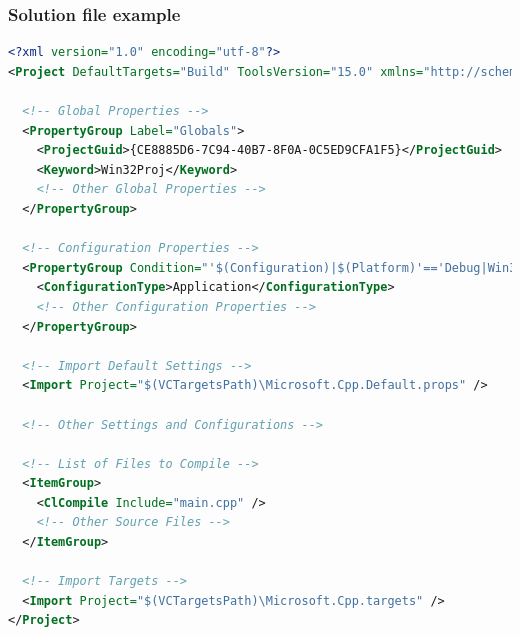 \documentclass{beamer}
\begin{document}
\begin{frame}[fragile]
\tiny
\frametitle{Solution file example}
\begin{lstlisting}[language=xml]
    <?xml version="1.0" encoding="utf-8"?>
<Project DefaultTargets="Build" ToolsVersion="15.0" xmlns="http://schemas.microsoft.com/developer/msbuild/2003">

  <!-- Global Properties -->
  <PropertyGroup Label="Globals">
    <ProjectGuid>{CE8885D6-7C94-40B7-8F0A-0C5ED9CFA1F5}</ProjectGuid>
    <Keyword>Win32Proj</Keyword>
    <!-- Other Global Properties -->
  </PropertyGroup>

  <!-- Configuration Properties -->
  <PropertyGroup Condition="'$(Configuration)|$(Platform)'=='Debug|Win32'" Label="Configuration">
    <ConfigurationType>Application</ConfigurationType>
    <!-- Other Configuration Properties -->
  </PropertyGroup>

  <!-- Import Default Settings -->
  <Import Project="$(VCTargetsPath)\Microsoft.Cpp.Default.props" />

  <!-- Other Settings and Configurations -->

  <!-- List of Files to Compile -->
  <ItemGroup>
    <ClCompile Include="main.cpp" />
    <!-- Other Source Files -->
  </ItemGroup>

  <!-- Import Targets -->
  <Import Project="$(VCTargetsPath)\Microsoft.Cpp.targets" />
</Project>
\end{lstlisting}
\end{frame}
\end{document}

